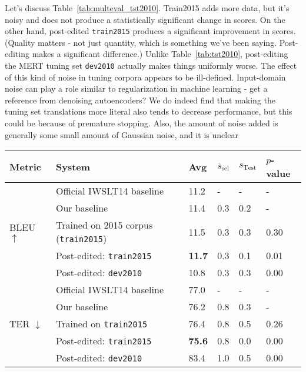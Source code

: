 {%
Let's discuss Table~\ref{tab:multeval_tst2010}.
Train2015 adds more data, but it's noisy and does not produce a statistically significant change in scores.
On the other hand, post-edited {\small \tt train2015} produces a significant improvement in scores.
(Quality matters - not just quantity, which is something we've been saying. Post-editing makes a significant difference.)
Unlike Table~\ref{tab:tst2010}, post-editing the MERT tuning set {\small \tt dev2010} actually makes things uniformly worse.
The effect of this kind of noise in tuning corpora appears to be ill-defined.
Input-domain noise can play a role similar to regularization in machine learning - get a reference from denoising autoencoders?
We do indeed find that making the tuning set translations more literal also tends to decrease performance, but this could be because of premature stopping.
Also, the amount of noise added is generally some small amount of Gaussian noise, and it is unclear

\begin{table}[htb]
\begin{center}
\begin{tabular}{|l|l|l|l|l|l|}
\hline
\bf Metric & \bf System & \bf Avg & \bf $\overline{s}_{\text{sel}}$ & \bf $s_{\text{Test}}$ & \bf $p$-value \\
\hline
\multirow{5}{*}{BLEU $\uparrow$}
& Official IWSLT14 baseline  & 11.2 & -   & -   & - \\
& Our baseline & 11.4 & 0.3 & 0.2 & - \\
& Trained on 2015 corpus ({\small \tt train2015}) & 11.5 & 0.3 & 0.3 & 0.30 \\
& Post-edited: {\small \tt train2015} & \textbf{11.7} & 0.3 & 0.1 & 0.01 \\
& Post-edited: {\small \tt dev2010} & 10.8 & 0.3 & 0.3 & 0.00 \\
\hline
\multirow{5}{*}{TER $\downarrow$}
& Official IWSLT14 baseline & 77.0 & -   & -   & - \\
& Our baseline & 76.2 & 0.8 & 0.3 & - \\
& Trained on {\small \tt train2015} & 76.4 & 0.8 & 0.5 & 0.26 \\
& Post-edited: {\small \tt train2015} & \textbf{75.6} & 0.8 & 0.0 & 0.00 \\
& Post-edited: {\small \tt dev2010} & 83.4 & 1.0 & 0.5 & 0.00 \\
\hline
\end{tabular}
\end{center}


\end{table}}

